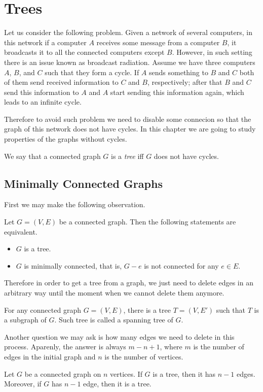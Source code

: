 \chapter{Trees}
Let us consider the following problem. Given a network of several computers,
in this network if a computer $A$ receives some message from a computer $B$,
it broadcasts it to all the connected computers except $B$.
However, in such setting there is an issue known as broadcast radiation.
Assume we have three computers $A$, $B$, and $C$ such that they form a cycle.
If $A$ sends something to $B$ and $C$ both of them send received information to
$C$ and $B$, respectively; after that $B$ and $C$ send this information to $A$
and $A$ start sending this information again, which leads to an infinite cycle.

Therefore to avoid such problem we need to disable some connecion so that the
graph of this network does not have cycles.
In this chapter we are going to study properties of the graphs without cycles.
\begin{definition}
  We say that a connected graph $G$ is a \emph{tree} iff $G$ does not have cycles.
\end{definition}

\section{Minimally Connected Graphs}
First we may make the following observation.
\begin{theorem}
  Let $G = (V, E)$ be a connected graph. Then the following statements are
  equivalent.
  \begin{itemize}
    \item $G$ is a tree.
    \item $G$ is minimally connected, that is, $G - e$ is not connected for any
      $e \in E$.
  \end{itemize}
\end{theorem}

Therefore in order to get a tree from a graph, we just need to delete edges
in an arbitrary way until the moment when we cannot delete them anymore.
\begin{corollary}
  For any connected graph $G = (V, E)$, there is a tree $T = (V, E')$ such
  that $T$ is a subgraph of $G$. Such tree is called a spanning tree of $G$.
\end{corollary}

Another question we may ask is how many edges we need to delete in this process.
Aparenly, the answer is always $m - n + 1$, where $m$ is the number of edges in
the initial graph and $n$ is the number of vertices.
\begin{theorem}
  Let $G$ be a connected graph on $n$ vertices.
  If $G$ is a tree, then it has $n - 1$ edges. Moreover, if $G$ has $n - 1$
  edge, then it is a tree.
\end{theorem}


